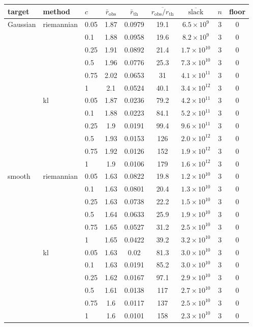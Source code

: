 \begin{tabular}{lllcccccc}
\toprule
target & method & $c$ & $\bar r_{\mathrm{obs}}$ & $\bar r_{\mathrm{th}}$ & $\overline{r_{\mathrm{obs}}/r_{\mathrm{th}}}$ & $\overline{\mathrm{slack}}$ & $n$ & floor \\
\midrule
Gaussian & riemannian & 0.05 & 1.87 & 0.0979 & 19.1 & $6.5\times10^{9}$ & 3 & 0 \\
 &  & 0.1 & 1.88 & 0.0958 & 19.6 & $8.2\times10^{9}$ & 3 & 0 \\
 &  & 0.25 & 1.91 & 0.0892 & 21.4 & $1.7\times10^{10}$ & 3 & 0 \\
 &  & 0.5 & 1.96 & 0.0776 & 25.3 & $7.3\times10^{10}$ & 3 & 0 \\
 &  & 0.75 & 2.02 & 0.0653 & 31 & $4.1\times10^{11}$ & 3 & 0 \\
 &  & 1 & 2.1 & 0.0524 & 40.1 & $3.4\times10^{12}$ & 3 & 0 \\
\midrule
 & kl & 0.05 & 1.87 & 0.0236 & 79.2 & $4.2\times10^{11}$ & 3 & 0 \\
 &  & 0.1 & 1.88 & 0.0223 & 84.1 & $5.2\times10^{11}$ & 3 & 0 \\
 &  & 0.25 & 1.9 & 0.0191 & 99.4 & $9.6\times10^{11}$ & 3 & 0 \\
 &  & 0.5 & 1.93 & 0.0153 & 126 & $2.0\times10^{12}$ & 3 & 0 \\
 &  & 0.75 & 1.92 & 0.0126 & 152 & $1.9\times10^{12}$ & 3 & 0 \\
 &  & 1 & 1.9 & 0.0106 & 179 & $1.6\times10^{12}$ & 3 & 0 \\
\midrule
smooth & riemannian & 0.05 & 1.63 & 0.0822 & 19.8 & $1.2\times10^{10}$ & 3 & 0 \\
 &  & 0.1 & 1.63 & 0.0801 & 20.4 & $1.3\times10^{10}$ & 3 & 0 \\
 &  & 0.25 & 1.63 & 0.0738 & 22.2 & $1.5\times10^{10}$ & 3 & 0 \\
 &  & 0.5 & 1.64 & 0.0633 & 25.9 & $1.9\times10^{10}$ & 3 & 0 \\
 &  & 0.75 & 1.65 & 0.0527 & 31.2 & $2.5\times10^{10}$ & 3 & 0 \\
 &  & 1 & 1.65 & 0.0422 & 39.2 & $3.2\times10^{10}$ & 3 & 0 \\
\midrule
 & kl & 0.05 & 1.63 & 0.02 & 81.3 & $3.0\times10^{10}$ & 3 & 0 \\
 &  & 0.1 & 1.63 & 0.0191 & 85.2 & $3.0\times10^{10}$ & 3 & 0 \\
 &  & 0.25 & 1.62 & 0.0167 & 97.1 & $2.9\times10^{10}$ & 3 & 0 \\
 &  & 0.5 & 1.61 & 0.0138 & 117 & $2.7\times10^{10}$ & 3 & 0 \\
 &  & 0.75 & 1.6 & 0.0117 & 137 & $2.5\times10^{10}$ & 3 & 0 \\
 &  & 1 & 1.6 & 0.0101 & 158 & $2.3\times10^{10}$ & 3 & 0 \\
\bottomrule
\end{tabular}
